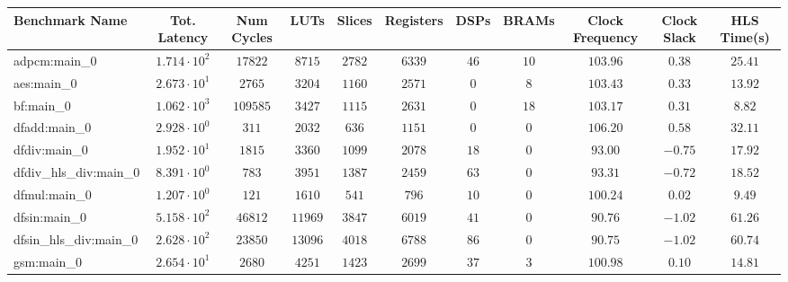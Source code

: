 \begin{tabular}{|l|c|c|c|c|c|c|c|c|c|c|}
\hline
Benchmark Name          & Tot. Latency           & Num Cycles & LUTs      & Slices    & Registers & DSPs    & BRAMs   & Clock Frequency & Clock Slack & HLS Time(s) \\
\hline
adpcm:main\_0           & $ 1.714 \cdot 10^{2} $ & $ 17822  $ & $ 8715  $ & $ 2782  $ & $ 6339  $ & $ 46  $ & $ 10  $ & $ 103.96      $ & $ 0.38    $ & $ 25.41   $ \\
aes:main\_0             & $ 2.673 \cdot 10^{1} $ & $ 2765   $ & $ 3204  $ & $ 1160  $ & $ 2571  $ & $ 0   $ & $ 8   $ & $ 103.43      $ & $ 0.33    $ & $ 13.92   $ \\
bf:main\_0              & $ 1.062 \cdot 10^{3} $ & $ 109585 $ & $ 3427  $ & $ 1115  $ & $ 2631  $ & $ 0   $ & $ 18  $ & $ 103.17      $ & $ 0.31    $ & $ 8.82    $ \\
dfadd:main\_0           & $ 2.928 \cdot 10^{0} $ & $ 311    $ & $ 2032  $ & $ 636   $ & $ 1151  $ & $ 0   $ & $ 0   $ & $ 106.20      $ & $ 0.58    $ & $ 32.11   $ \\
dfdiv:main\_0           & $ 1.952 \cdot 10^{1} $ & $ 1815   $ & $ 3360  $ & $ 1099  $ & $ 2078  $ & $ 18  $ & $ 0   $ & $ 93.00       $ & $ -0.75   $ & $ 17.92   $ \\
dfdiv\_hls\_div:main\_0 & $ 8.391 \cdot 10^{0} $ & $ 783    $ & $ 3951  $ & $ 1387  $ & $ 2459  $ & $ 63  $ & $ 0   $ & $ 93.31       $ & $ -0.72   $ & $ 18.52   $ \\
dfmul:main\_0           & $ 1.207 \cdot 10^{0} $ & $ 121    $ & $ 1610  $ & $ 541   $ & $ 796   $ & $ 10  $ & $ 0   $ & $ 100.24      $ & $ 0.02    $ & $ 9.49    $ \\
dfsin:main\_0           & $ 5.158 \cdot 10^{2} $ & $ 46812  $ & $ 11969 $ & $ 3847  $ & $ 6019  $ & $ 41  $ & $ 0   $ & $ 90.76       $ & $ -1.02   $ & $ 61.26   $ \\
dfsin\_hls\_div:main\_0 & $ 2.628 \cdot 10^{2} $ & $ 23850  $ & $ 13096 $ & $ 4018  $ & $ 6788  $ & $ 86  $ & $ 0   $ & $ 90.75       $ & $ -1.02   $ & $ 60.74   $ \\
gsm:main\_0             & $ 2.654 \cdot 10^{1} $ & $ 2680   $ & $ 4251  $ & $ 1423  $ & $ 2699  $ & $ 37  $ & $ 3   $ & $ 100.98      $ & $ 0.10    $ & $ 14.81   $ \\

\end{tabular}
